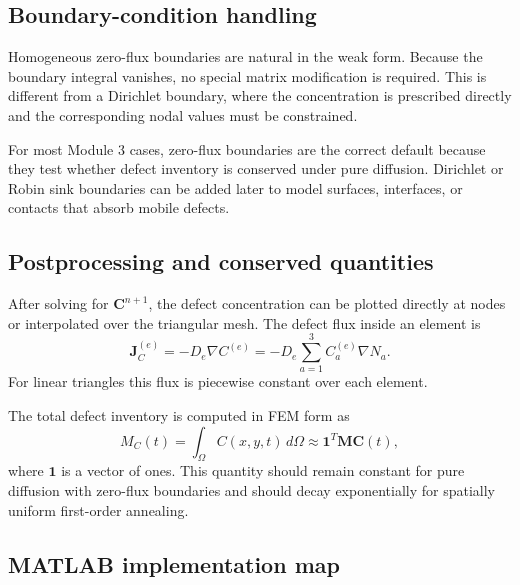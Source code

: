 \documentclass[11pt]{article}
\begin{document}
\subsection{Boundary-condition handling}

Homogeneous zero-flux boundaries are natural in the weak form. Because the boundary integral vanishes, no special matrix modification is required. This is different from a Dirichlet boundary, where the concentration is prescribed directly and the corresponding nodal values must be constrained.

For most Module 3 cases, zero-flux boundaries are the correct default because they test whether defect inventory is conserved under pure diffusion. Dirichlet or Robin sink boundaries can be added later to model surfaces, interfaces, or contacts that absorb mobile defects.

\subsection{Postprocessing and conserved quantities}

After solving for $\bm{C}^{n+1}$, the defect concentration can be plotted directly at nodes or interpolated over the triangular mesh. The defect flux inside an element is
\begin{equation}
\mathbf{J}_C^{(e)}=-D_e\nabla C^{(e)}
=-D_e\sum_{a=1}^{3}C_a^{(e)}\nabla N_a.
\end{equation}
For linear triangles this flux is piecewise constant over each element.

The total defect inventory is computed in FEM form as
\begin{equation}
M_C(t)=\int_{\Omega}C(x,y,t)\,d\Omega
\approx
\mathbf{1}^{T}\bm{M}\bm{C}(t),
\end{equation}
where $\mathbf{1}$ is a vector of ones. This quantity should remain constant for pure diffusion with zero-flux boundaries and should decay exponentially for spatially uniform first-order annealing.

\subsection{MATLAB implementation map}
\end{document}
